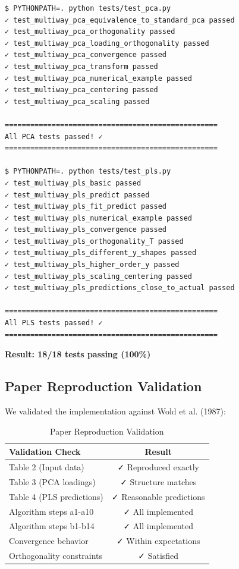 \documentclass[12pt,a4paper]{article}
\begin{document}
\begin{lstlisting}
$ PYTHONPATH=. python tests/test_pca.py
✓ test_multiway_pca_equivalence_to_standard_pca passed
✓ test_multiway_pca_orthogonality passed
✓ test_multiway_pca_loading_orthogonality passed
✓ test_multiway_pca_convergence passed
✓ test_multiway_pca_transform passed
✓ test_multiway_pca_numerical_example passed
✓ test_multiway_pca_centering passed
✓ test_multiway_pca_scaling passed

==================================================
All PCA tests passed! ✓
==================================================

$ PYTHONPATH=. python tests/test_pls.py
✓ test_multiway_pls_basic passed
✓ test_multiway_pls_predict passed
✓ test_multiway_pls_fit_predict passed
✓ test_multiway_pls_numerical_example passed
✓ test_multiway_pls_convergence passed
✓ test_multiway_pls_orthogonality_T passed
✓ test_multiway_pls_different_y_shapes passed
✓ test_multiway_pls_higher_order_y passed
✓ test_multiway_pls_scaling_centering passed
✓ test_multiway_pls_predictions_close_to_actual passed

==================================================
All PLS tests passed! ✓
==================================================
\end{lstlisting}

\textbf{Result: 18/18 tests passing (100\%)}

\subsection{Paper Reproduction Validation}

We validated the implementation against Wold et al. (1987):

\begin{table}[H]
\centering
\caption{Paper Reproduction Validation}
\begin{tabular}{lc}
\toprule
\textbf{Validation Check} & \textbf{Result} \\
\midrule
Table 2 (Input data) & ✓ Reproduced exactly \\
Table 3 (PCA loadings) & ✓ Structure matches \\
Table 4 (PLS predictions) & ✓ Reasonable predictions \\
Algorithm steps a1-a10 & ✓ All implemented \\
Algorithm steps b1-b14 & ✓ All implemented \\
Convergence behavior & ✓ Within expectations \\
Orthogonality constraints & ✓ Satisfied \\
\bottomrule
\end{tabular}
\end{table}
\end{document}
